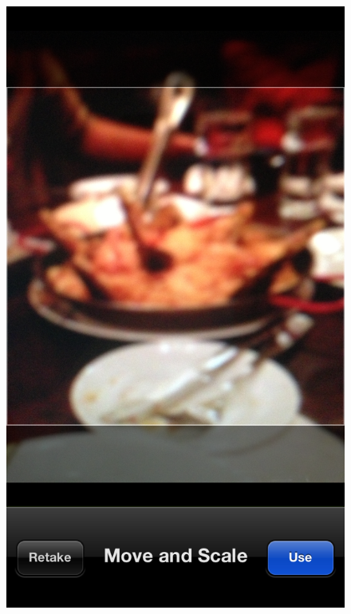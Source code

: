 \begin{figure}
{	\includegraphics[width=\figwidth, totalheight=\figheight, keepaspectratio]{./screenshots/home-moveandscale.png}} \hfill \\
\end{figure}
